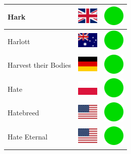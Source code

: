 \documentclass[12pt, a4paper, twoside]{report}
\begin{document}
\begin{center}
\begin{longtable}{|p{5cm}|p{2cm}|p{2cm}|}
 Hark                                                       & \includegraphics[width=1cm]{../img/flags/gb} &   \includegraphics[width=1cm]{../likes/y} \\ \hline
 Harlott                                                    & \includegraphics[width=1cm]{../img/flags/au} &   \includegraphics[width=1cm]{../likes/y} \\ \hline
 Harvest their Bodies                                       & \includegraphics[width=1cm]{../img/flags/de} &   \includegraphics[width=1cm]{../likes/y} \\ \hline
 Hate                                                       & \includegraphics[width=1cm]{../img/flags/pl} &   \includegraphics[width=1cm]{../likes/y} \\ \hline
 Hatebreed                                                  & \includegraphics[width=1cm]{../img/flags/us} &   \includegraphics[width=1cm]{../likes/y} \\ \hline
 Hate Eternal                                               & \includegraphics[width=1cm]{../img/flags/us} &   \includegraphics[width=1cm]{../likes/y} \\ \hline

\end{longtable}
\end{center}
\end{document}
